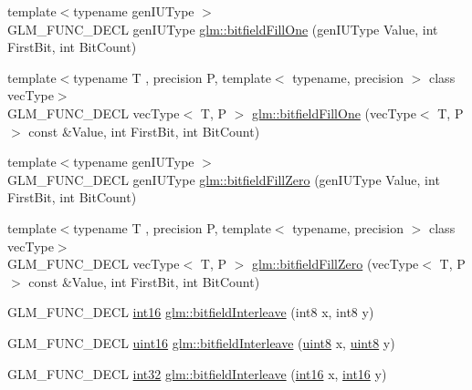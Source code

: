 \begin{DoxyCompactItemize}
\item 
{\footnotesize template$<$typename gen\+I\+U\+Type $>$ }\\G\+L\+M\+\_\+\+F\+U\+N\+C\+\_\+\+D\+E\+C\+L gen\+I\+U\+Type \hyperlink{group__gtc__bitfield_ga46f9295abe3b5c7658f5b13c7f819f0a}{glm\+::bitfield\+Fill\+One} (gen\+I\+U\+Type Value, int First\+Bit, int Bit\+Count)
\item 
{\footnotesize template$<$typename T , precision P, template$<$ typename, precision $>$ class vec\+Type$>$ }\\G\+L\+M\+\_\+\+F\+U\+N\+C\+\_\+\+D\+E\+C\+L vec\+Type$<$ T, P $>$ \hyperlink{group__gtc__bitfield_gad789042e84e8292ae95dc1af856f2ad5}{glm\+::bitfield\+Fill\+One} (vec\+Type$<$ T, P $>$ const \&Value, int First\+Bit, int Bit\+Count)
\item 
{\footnotesize template$<$typename gen\+I\+U\+Type $>$ }\\G\+L\+M\+\_\+\+F\+U\+N\+C\+\_\+\+D\+E\+C\+L gen\+I\+U\+Type \hyperlink{group__gtc__bitfield_ga697b86998b7d74ee0a69d8e9f8819fee}{glm\+::bitfield\+Fill\+Zero} (gen\+I\+U\+Type Value, int First\+Bit, int Bit\+Count)
\item 
{\footnotesize template$<$typename T , precision P, template$<$ typename, precision $>$ class vec\+Type$>$ }\\G\+L\+M\+\_\+\+F\+U\+N\+C\+\_\+\+D\+E\+C\+L vec\+Type$<$ T, P $>$ \hyperlink{group__gtc__bitfield_gaddba3196316b0bd240295b09b43c2958}{glm\+::bitfield\+Fill\+Zero} (vec\+Type$<$ T, P $>$ const \&Value, int First\+Bit, int Bit\+Count)
\item 
G\+L\+M\+\_\+\+F\+U\+N\+C\+\_\+\+D\+E\+C\+L \hyperlink{stb__image_8c_a259fa4834387bd68627ddf37bb3ebdb9}{int16} \hyperlink{group__gtc__bitfield_ga479134317bc95d99f2b2e235d3db287b}{glm\+::bitfield\+Interleave} (int8 x, int8 y)
\item 
G\+L\+M\+\_\+\+F\+U\+N\+C\+\_\+\+D\+E\+C\+L \hyperlink{stb__image_8c_a05f6b0ae8f6a6e135b0e290c25fe0e4e}{uint16} \hyperlink{group__gtc__bitfield_ga0700a3ceb088a0ecc23d76c154096061}{glm\+::bitfield\+Interleave} (\hyperlink{stb__image_8c_adde6aaee8457bee49c2a92621fe22b79}{uint8} x, \hyperlink{stb__image_8c_adde6aaee8457bee49c2a92621fe22b79}{uint8} y)
\item 
G\+L\+M\+\_\+\+F\+U\+N\+C\+\_\+\+D\+E\+C\+L \hyperlink{stb__image_8c_a43d43196463bde49cb067f5c20ab8481}{int32} \hyperlink{group__gtc__bitfield_ga1a0264598647ae00a596865af4e1e878}{glm\+::bitfield\+Interleave} (\hyperlink{stb__image_8c_a259fa4834387bd68627ddf37bb3ebdb9}{int16} x, \hyperlink{stb__image_8c_a259fa4834387bd68627ddf37bb3ebdb9}{int16} y)

\end{DoxyCompactItemize}
